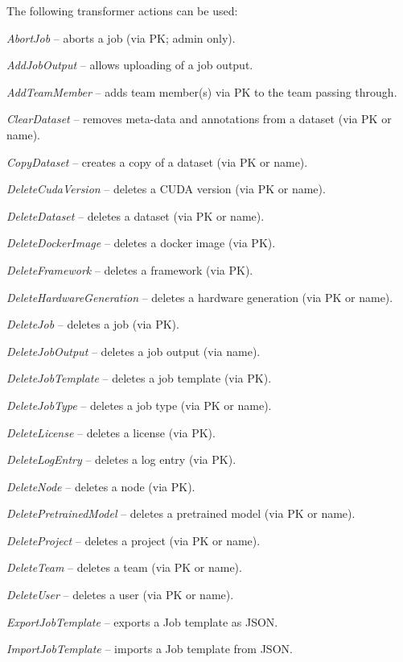 \documentclass[a4paper]{book}
\begin{document}
The following transformer actions can be used:
\begin{tight_itemize}
  \item \textit{AbortJob} -- aborts a job (via PK; admin only).
  \item \textit{AddJobOutput} -- allows uploading of a job output.
  \item \textit{AddTeamMember} -- adds team member(s) via PK to the team passing through.
  \item \textit{ClearDataset} -- removes meta-data and annotations from a dataset (via PK or name).
  \item \textit{CopyDataset} -- creates a copy of a dataset (via PK or name).
  \item \textit{DeleteCudaVersion} -- deletes a CUDA version (via PK or name).
  \item \textit{DeleteDataset} -- deletes a dataset (via PK or name).
  \item \textit{DeleteDockerImage} -- deletes a docker image (via PK).
  \item \textit{DeleteFramework} -- deletes a framework (via PK).
  \item \textit{DeleteHardwareGeneration} -- deletes a hardware generation (via PK or name).
  \item \textit{DeleteJob} -- deletes a job (via PK).
  \item \textit{DeleteJobOutput} -- deletes a job output (via name).
  \item \textit{DeleteJobTemplate} -- deletes a job template (via PK).
  \item \textit{DeleteJobType} -- deletes a job type (via PK or name).
  \item \textit{DeleteLicense} -- deletes a license (via PK).
  \item \textit{DeleteLogEntry} -- deletes a log entry (via PK).
  \item \textit{DeleteNode} -- deletes a node (via PK).
  \item \textit{DeletePretrainedModel} -- deletes a pretrained model (via PK or name).
  \item \textit{DeleteProject} -- deletes a project (via PK or name).
  \item \textit{DeleteTeam} -- deletes a team (via PK or name).
  \item \textit{DeleteUser} -- deletes a user (via PK or name).
  \item \textit{ExportJobTemplate} -- exports a Job template as JSON.
  \item \textit{ImportJobTemplate} -- imports a Job template from JSON.

\end{tight_itemize}
\end{document}
